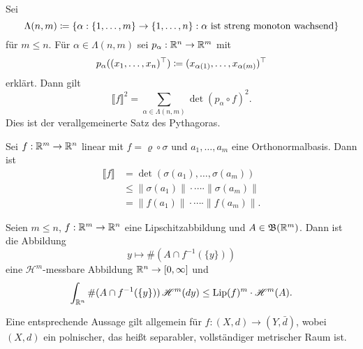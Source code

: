 \documentclass[a4paper,twoside,DIV15,BCOR12mm]{scrbook}
\newcommand{\borel}{\mathfrak B}
\newcommand{\HM}{\mathscr H}
\DeclareMathOperator{\Lip}{Lip}
\begin{document}
\begin{bemerkungen}
\item Sei
\[
\Lambda(n,m) \da \{\alpha:\{1,\ldots,m\} \to \{1,\ldots,n\} : \text{$\alpha$ ist streng monoton wachsend}\}
\]
für $m\le n$. Für $\alpha \in\Lambda(n,m)$ sei $p_\alpha: \mathbb{R}^n \to\mathbb{R}^m$ mit
\[
p_\alpha( (x_1,\ldots,x_n)^\top ) \da (x_{\alpha(1)},\ldots,x_{\alpha(m)})^\top
\]
erklärt. Dann gilt
\[
\llbracket f \rrbracket^2 = \sum_{\alpha\in \Lambda(n,m)}  \det(p_\alpha \circ f)^2.
\]
Dies ist der verallgemeinerte Satz des Pythagoras.
\item Sei $f:\mathbb{R}^m \to \mathbb{R}^n$ linear mit $f=\varrho\circ\sigma$ und $a_1,\ldots,a_m$ eine Orthonormalbasis. Dann ist
\begin{align*}
\llbracket f \rrbracket 
&= \det(\sigma(a_1),\ldots,\sigma(a_m)) \\
&\le \|\sigma(a_1)\|\cdot \cdots \cdot \|\sigma(a_m)\| \\
&= \|f(a_1)\|\cdot \cdots \cdot \|f(a_m)\|.
\end{align*}
\end{bemerkungen}

\begin{proposition}
\label{prop:3.5}
Seien $m\le n$, $f:\mathbb{R}^m\to\mathbb{R}^n$ eine Lipschitzabbildung und $A\in \borel(\MdR^m)$. Dann ist die Abbildung
\[
y\mapsto \#(A\cap f^{-1}(\{y\}))
\]
eine $\HM^m$-messbare Abbildung $\mathbb{R}^n\to [0,\infty]$ und
\[
\int_{\MdR^n} \#(A\cap f^{-1}(\{y\}))\, \HM^m(dy) \le \Lip(f)^m \cdot \HM^m(A).
\]
\end{proposition}

\begin{bemerkung}
Eine entsprechende Aussage gilt allgemein für $f:(X,d)\to (Y,\bar d)$, wobei $(X,d)$ ein polnischer, das heißt separabler, vollständiger metrischer Raum ist.
\end{bemerkung}
\end{document}

